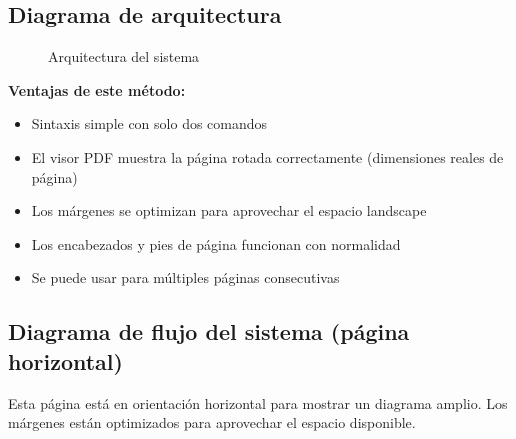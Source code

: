 \begin{latexcode}[title={Código para página horizontal (método simplificado)}]
\BeginLandscapePage[2cm]

\section{Diagrama de arquitectura}
\begin{figure}[htbp]
  \centering
  \caption{Arquitectura del sistema}
  \label{fig:arquitectura-landscape}
\end{figure}

\EndLandscapePage
\end{latexcode}

\textbf{Ventajas de este método:}
\begin{itemize}
  \item Sintaxis simple con solo dos comandos
  \item El visor PDF muestra la página rotada correctamente (dimensiones reales de página)
  \item Los márgenes se optimizan para aprovechar el espacio landscape
  \item Los encabezados y pies de página funcionan con normalidad
  \item Se puede usar para múltiples páginas consecutivas
\end{itemize}

\BeginLandscapePage[2cm]  %

\subsection{Diagrama de flujo del sistema (página horizontal)}
\label{subsec:diagrama-landscape}

Esta página está en orientación horizontal para mostrar un diagrama amplio.
Los márgenes están optimizados para aprovechar el espacio disponible.

